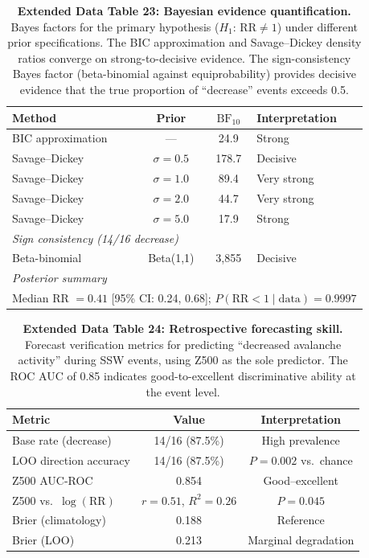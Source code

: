 \documentclass[11pt,letterpaper]{article}
\begin{document}
\begin{table}[!ht]
\centering
\caption{\textbf{Extended Data Table 23: Bayesian evidence quantification.}
Bayes factors for the primary hypothesis ($H_1$: $\mathrm{RR} \neq 1$) under different prior specifications. The BIC approximation and Savage--Dickey density ratios converge on strong-to-decisive evidence. The sign-consistency Bayes factor (beta-binomial against equiprobability) provides decisive evidence that the true proportion of ``decrease'' events exceeds 0.5.}
\label{tab:bayesian}
\small
\begin{tabular}{lccl}
\toprule
Method & Prior & $\mathrm{BF}_{10}$ & Interpretation \\
\midrule
BIC approximation & --- & 24.9 & Strong \\
Savage--Dickey & $\sigma = 0.5$ & 178.7 & Decisive \\
Savage--Dickey & $\sigma = 1.0$ & 89.4 & Very strong \\
Savage--Dickey & $\sigma = 2.0$ & 44.7 & Very strong \\
Savage--Dickey & $\sigma = 5.0$ & 17.9 & Strong \\
\midrule
\multicolumn{4}{l}{\textit{Sign consistency (14/16 decrease)}} \\
Beta-binomial & Beta(1,1) & 3,855 & Decisive \\
\midrule
\multicolumn{4}{l}{\textit{Posterior summary}} \\
\multicolumn{4}{l}{Median RR $= 0.41$ [95\% CI: 0.24, 0.68]; $P(\mathrm{RR} < 1 \mid \mathrm{data}) = 0.9997$} \\
\bottomrule
\end{tabular}
\end{table}

\begin{table}[!ht]
\centering
\caption{\textbf{Extended Data Table 24: Retrospective forecasting skill.}
Forecast verification metrics for predicting ``decreased avalanche activity'' during SSW events, using Z500 as the sole predictor. The ROC AUC of 0.85 indicates good-to-excellent discriminative ability at the event level.}
\label{tab:forecast_skill}
\small
\begin{tabular}{lcc}
\toprule
Metric & Value & Interpretation \\
\midrule
Base rate (decrease) & 14/16 (87.5\%) & High prevalence \\
LOO direction accuracy & 14/16 (87.5\%) & $P = 0.002$ vs.\ chance \\
Z500 AUC-ROC & 0.854 & Good--excellent \\
Z500 vs.\ $\log(\mathrm{RR})$ & $r = 0.51$, $R^2 = 0.26$ & $P = 0.045$ \\
Brier (climatology) & 0.188 & Reference \\
Brier (LOO) & 0.213 & Marginal degradation \\
\bottomrule
\end{tabular}
\end{table}
\end{document}
